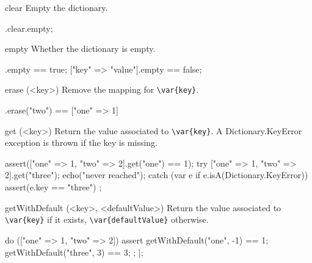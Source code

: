 \begin{urbiscriptapi}
\item[clear]
  Empty the dictionary.

\begin{urbiassert}
["one" => 1].clear.empty;
\end{urbiassert}


\item[empty]
  Whether the dictionary is empty.

\begin{urbiassert}
[=>].empty == true;
["key" => "value"].empty == false;
\end{urbiassert}


\item[erase](<key>)
  Remove the mapping for \lstinline|\var{key}|.

\begin{urbiassert}
["one" => 1, "two" => 2].erase("two") == ["one" => 1]
\end{urbiassert}





\item[get](<key>)
  Return the value associated to \lstinline|\var{key}|.  A
  Dictionary.KeyError exception is thrown if the key is missing.

\begin{urbiscript}
assert(["one" => 1, "two" => 2].get("one") == 1);
try
{
  ["one" => 1, "two" => 2].get("three");
  echo("never reached");
}
catch (var e if e.isA(Dictionary.KeyError))
{
  assert(e.key == "three")
};
\end{urbiscript}


\item[getWithDefault](<key>, <defaultValue>)
  Return the value associated to  \lstinline|\var{key}| if it exists,
  \lstinline|\var{defaultValue}| otherwise.

\begin{urbiscript}
do (["one" => 1, "two" => 2])
{
  assert
  {
    getWithDefault("one",  -1) == 1;
    getWithDefault("three", 3) == 3;
  };
}|;
\end{urbiscript}



\end{urbiscriptapi}
